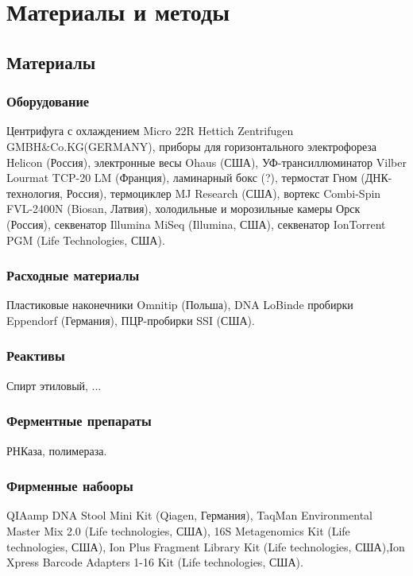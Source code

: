 \chapter{Материалы и методы} \label{chapt1}

\section{Материалы} \label{sect1_1}

\subsection{Оборудование}

Центрифуга с охлаждением Micro 22R Hettich Zentrifugen GMBH\&Co.KG(GERMANY), приборы для горизонтального электрофореза Helicon (Россия), электронные весы Ohaus (США), УФ-трансиллюминатор Vilber Lourmat TCP-20 LM (Франция), ламинарный бокс (?), термостат Гном (ДНК-технология, Россия), термоциклер MJ Research (США), вортекс Combi-Spin FVL-2400N (Biosan, Латвия), холодильные и морозильные камеры Орск (Россия), секвенатор Illumina MiSeq (Illumina, США), секвенатор IonTorrent PGM (Life Technologies, США).

\subsection{Расходные материалы}
Пластиковые наконечники Omnitip (Польша), DNA LoBinde пробирки Eppendorf (Германия), ПЦР-пробирки SSI (США).

\subsection{Реактивы}
Спирт этиловый, ...

\subsection{Ферментные препараты}
РНКаза, полимераза.

\subsection{Фирменные набооры}
QIAamp DNA Stool Mini Kit (Qiagen, Германия), TaqMan Environmental Master Mix 2.0 (Life technologies, США), 16S Metagenomics Kit (Life technologies, США),  Ion Plus Fragment Library Kit (Life technologies, США),Ion Xpress Barcode Adapters 1-16 Kit (Life technologies, США).

